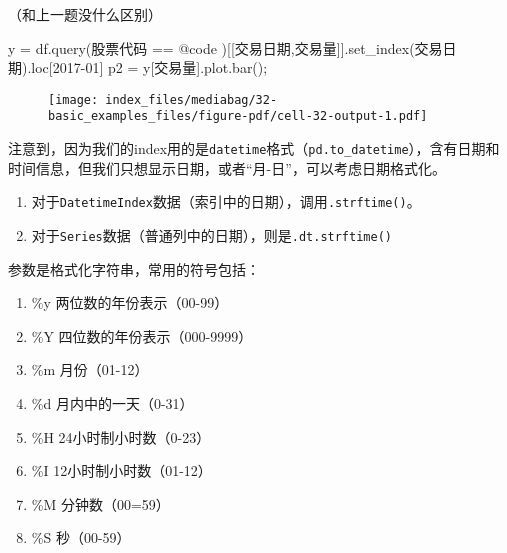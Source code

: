 \documentclass[
  letterpaper,
  DIV=11,
  numbers=noendperiod]{scrreprt}
\newenvironment{Shaded}{\begin{snugshade}}{\end{snugshade}}
\newcommand{\NormalTok}[1]{\textcolor[rgb]{0.00,0.23,0.31}{#1}}
\newcommand{\OperatorTok}[1]{\textcolor[rgb]{0.37,0.37,0.37}{#1}}
\newcommand{\StringTok}[1]{\textcolor[rgb]{0.13,0.47,0.30}{#1}}
\providecommand{\tightlist}{%
  \setlength{\itemsep}{0pt}\setlength{\parskip}{0pt}}\usepackage{longtable,booktabs,array}
\begin{document}
（和上一题没什么区别）

\begin{Shaded}
\begin{Highlighting}[]
\NormalTok{y }\OperatorTok{=}\NormalTok{ df.query(}\StringTok{\textquotesingle{}股票代码 == @code \textquotesingle{}}\NormalTok{)[[}\StringTok{\textquotesingle{}交易日期\textquotesingle{}}\NormalTok{,}\StringTok{\textquotesingle{}交易量\textquotesingle{}}\NormalTok{]].set\_index(}\StringTok{\textquotesingle{}交易日期\textquotesingle{}}\NormalTok{).loc[}\StringTok{\textquotesingle{}2017{-}01\textquotesingle{}}\NormalTok{]}
\NormalTok{p2 }\OperatorTok{=}\NormalTok{ y[}\StringTok{\textquotesingle{}交易量\textquotesingle{}}\NormalTok{].plot.bar()}\OperatorTok{;}
\end{Highlighting}
\end{Shaded}

\begin{figure}[H]

{\centering \texttt{[image: index\_files/mediabag/32-basic\_examples\_files/figure-pdf/cell-32-output-1.pdf]}

}

\end{figure}

注意到，因为我们的index用的是\texttt{datetime}格式（\texttt{pd.to\_datetime}），含有日期和时间信息，但我们只想显示日期，或者``月-日''，可以考虑日期格式化。

\begin{enumerate}
\def\labelenumi{\arabic{enumi}.}
\tightlist
\item
  对于\texttt{DatetimeIndex}数据（索引中的日期），调用\texttt{.strftime()}。
\item
  对于\texttt{Series}数据（普通列中的日期），则是\texttt{.dt.strftime()}
\end{enumerate}

参数是格式化字符串，常用的符号包括：

\begin{enumerate}
\def\labelenumi{\arabic{enumi}.}
\tightlist
\item
  \%y 两位数的年份表示（00-99）
\item
  \%Y 四位数的年份表示（000-9999）
\item
  \%m 月份（01-12）
\item
  \%d 月内中的一天（0-31）
\item
  \%H 24小时制小时数（0-23）
\item
  \%I 12小时制小时数（01-12）
\item
  \%M 分钟数（00=59）
\item
  \%S 秒（00-59）
\end{enumerate}
\end{document}
